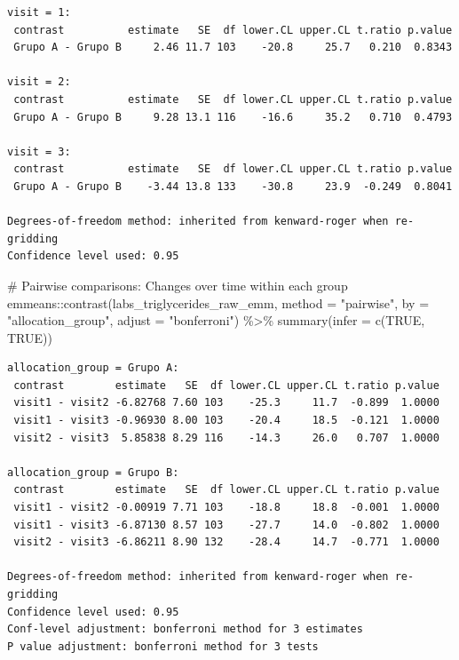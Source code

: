 \documentclass[
  12pt,
]{article}
\newenvironment{Shaded}{\begin{snugshade}}{\end{snugshade}}
\newcommand{\AttributeTok}[1]{\textcolor[rgb]{0.40,0.45,0.13}{#1}}
\newcommand{\CommentTok}[1]{\textcolor[rgb]{0.37,0.37,0.37}{#1}}
\newcommand{\ConstantTok}[1]{\textcolor[rgb]{0.56,0.35,0.01}{#1}}
\newcommand{\FunctionTok}[1]{\textcolor[rgb]{0.28,0.35,0.67}{#1}}
\newcommand{\NormalTok}[1]{\textcolor[rgb]{0.00,0.23,0.31}{#1}}
\newcommand{\SpecialCharTok}[1]{\textcolor[rgb]{0.37,0.37,0.37}{#1}}
\newcommand{\StringTok}[1]{\textcolor[rgb]{0.13,0.47,0.30}{#1}}
\begin{document}
\begin{verbatim}
visit = 1:
 contrast          estimate   SE  df lower.CL upper.CL t.ratio p.value
 Grupo A - Grupo B     2.46 11.7 103    -20.8     25.7   0.210  0.8343

visit = 2:
 contrast          estimate   SE  df lower.CL upper.CL t.ratio p.value
 Grupo A - Grupo B     9.28 13.1 116    -16.6     35.2   0.710  0.4793

visit = 3:
 contrast          estimate   SE  df lower.CL upper.CL t.ratio p.value
 Grupo A - Grupo B    -3.44 13.8 133    -30.8     23.9  -0.249  0.8041

Degrees-of-freedom method: inherited from kenward-roger when re-gridding 
Confidence level used: 0.95 
\end{verbatim}

\begin{Shaded}
\begin{Highlighting}[]
\CommentTok{\# Pairwise comparisons: Changes over time within each group}
\NormalTok{emmeans}\SpecialCharTok{::}\FunctionTok{contrast}\NormalTok{(labs\_triglycerides\_raw\_emm,}
\AttributeTok{method =} \StringTok{"pairwise"}\NormalTok{, }\AttributeTok{by =} \StringTok{"allocation\_group"}\NormalTok{,}
\AttributeTok{adjust =} \StringTok{"bonferroni"}\NormalTok{) }\SpecialCharTok{\%\textgreater{}\%} \FunctionTok{summary}\NormalTok{(}\AttributeTok{infer =} \FunctionTok{c}\NormalTok{(}\ConstantTok{TRUE}\NormalTok{, }\ConstantTok{TRUE}\NormalTok{))}
\end{Highlighting}
\end{Shaded}

\begin{verbatim}
allocation_group = Grupo A:
 contrast        estimate   SE  df lower.CL upper.CL t.ratio p.value
 visit1 - visit2 -6.82768 7.60 103    -25.3     11.7  -0.899  1.0000
 visit1 - visit3 -0.96930 8.00 103    -20.4     18.5  -0.121  1.0000
 visit2 - visit3  5.85838 8.29 116    -14.3     26.0   0.707  1.0000

allocation_group = Grupo B:
 contrast        estimate   SE  df lower.CL upper.CL t.ratio p.value
 visit1 - visit2 -0.00919 7.71 103    -18.8     18.8  -0.001  1.0000
 visit1 - visit3 -6.87130 8.57 103    -27.7     14.0  -0.802  1.0000
 visit2 - visit3 -6.86211 8.90 132    -28.4     14.7  -0.771  1.0000

Degrees-of-freedom method: inherited from kenward-roger when re-gridding 
Confidence level used: 0.95 
Conf-level adjustment: bonferroni method for 3 estimates 
P value adjustment: bonferroni method for 3 tests 
\end{verbatim}
\end{document}
